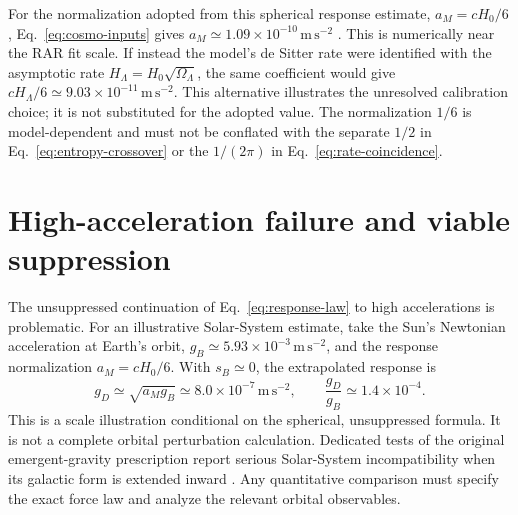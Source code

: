 \documentclass[12pt]{article}
\begin{document}
For the normalization adopted from this spherical response estimate, $a_M=cH_0/6$, Eq.~\eqref{eq:cosmo-inputs} gives $a_M\simeq1.09\times10^{-10}\,\mathrm{m\,s^{-2}}$ \cite{Verlinde}. This is numerically near the RAR fit scale. If instead the model's de Sitter rate were identified with the asymptotic rate $H_\Lambda=H_0\sqrt{\Omega_\Lambda}$, the same coefficient would give $cH_\Lambda/6\simeq9.03\times10^{-11}\,\mathrm{m\,s^{-2}}$. This alternative illustrates the unresolved calibration choice; it is not substituted for the adopted value. The normalization $1/6$ is model-dependent and must not be conflated with the separate $1/2$ in Eq.~\eqref{eq:entropy-crossover} or the $1/(2\pi)$ in Eq.~\eqref{eq:rate-coincidence}.

\section{High-acceleration failure and viable suppression}
\label{sec:transition}

The unsuppressed continuation of Eq.~\eqref{eq:response-law} to high accelerations is problematic. For an illustrative Solar-System estimate, take the Sun's Newtonian acceleration at Earth's orbit, $g_B\simeq5.93\times10^{-3}\,\mathrm{m\,s^{-2}}$, and the response normalization $a_M=cH_0/6$. With $s_B\simeq0$, the extrapolated response is
\begin{equation}
  g_D\simeq\sqrt{a_Mg_B}
  \simeq8.0\times10^{-7}\,\mathrm{m\,s^{-2}},
  \qquad
  \frac{g_D}{g_B}\simeq1.4\times10^{-4}.
  \label{eq:earth-extrapolation}
\end{equation}
This is a scale illustration conditional on the spherical, unsuppressed formula. It is not a complete orbital perturbation calculation. Dedicated tests of the original emergent-gravity prescription report serious Solar-System incompatibility when its galactic form is extended inward \cite{Hees}. Any quantitative comparison must specify the exact force law and analyze the relevant orbital observables.
\end{document}
